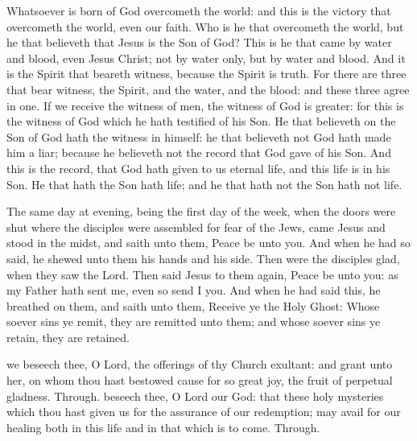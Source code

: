  Whatsoever is born of God overcometh the world: and this is the victory that overcometh the world, even our faith. Who is he that overcometh the world, but he that believeth that Jesus is the Son of God? This is he that came by water and blood, even Jesus Christ; not by water only, but by water and blood. And it is the Spirit that beareth witness, because the Spirit is truth. For there are three that bear witness, the Spirit, and the water, and the blood: and these three agree in one. If we receive the witness of men, the witness of God is greater: for this is the witness of God which he hath testified of his Son. He that believeth on the Son of God hath the witness in himself: he that believeth not God hath made him a liar; because he believeth not the record that God gave of his Son. And this is the record, that God hath given to us eternal life, and this life is in his Son. He that hath the Son hath life; and he that hath not the Son hath not life.


 The same day at evening, being the first day of the week, when the doors were shut where the disciples were assembled for fear of the Jews, came Jesus and stood in the midst, and saith unto them, Peace be unto you. And when he had so said, he shewed unto them his hands and his side. Then were the disciples glad, when they saw the Lord. Then said Jesus to them again, Peace be unto you: as my Father hath sent me, even so send I you. And when he had said this, he breathed on them, and saith unto them, Receive ye the Holy Ghost: Whose soever sins ye remit, they are remitted unto them; and whose soever sins ye retain, they are retained.

\secret
{} we beseech thee, O Lord, the offerings of thy Church exultant: and grant unto her, on whom thou hast bestowed cause for so great joy, the fruit of perpetual gladness. Through.
\postcommunion
{} beseech thee, O Lord our God: that these holy mysteries which thou hast given us for the assurance of our redemption; may avail for our healing both in this life and in that which is to come. Through.

